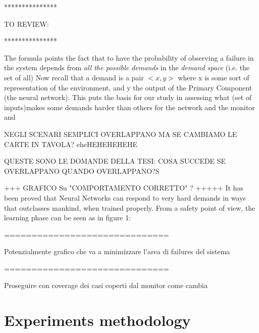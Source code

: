 ***************\newline

TO REVIEW:\newline

***************\newline

The formula points the fact that to have the probability of observing a failure in the system depends from \textsl{all the possible demands} in the \textsl{demand space} (i.e. the set of all)
Now recall that a demand is a pair $<x, y>$ where x is some sort of representation of the environment, and y the output of the Primary Component (the neural network).\newline
This puts the basis for our study in assessing what (set of inputs)makes some demands harder than others for the network and the monitor and 

NEGLI SCENARI SEMPLICI OVERLAPPANO MA SE CAMBIAMO LE CARTE IN TAVOLA? eheHEHEHEHEHE

QUESTE SONO LE DOMANDE DELLA TESI: COSA SUCCEDE SE OVERLAPPANO QUANDO OVERLAPPANO?S



+++ GRAFICO Su "COMPORTAMENTO CORRETTO" ? +++++\newline
It has been proved that Neural Networks can respond to very hard demands in ways that outclasses mankind, when trained properly. From a safety point of view, the learning phase can be seen as in figure 1:\newline

==============================\newline

Potenzialmente grafico che va a minimizzare l'area di failures del sistema\newline

==============================\newline

Proseguire con coverage dei casi coperti dal monitor come cambia

\section{Experiments methodology}

